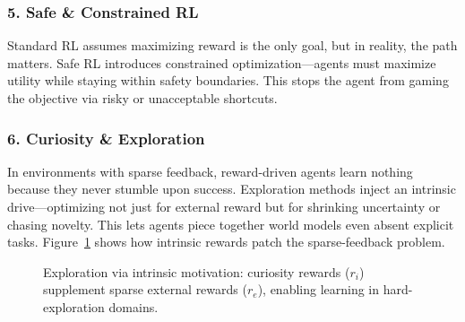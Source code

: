 \documentclass[12pt,a4paper]{report}
\theoremstyle{definition}
\begin{document}
\subsubsection*{5. Safe \& Constrained RL}
Standard RL assumes maximizing reward is the only goal, but in reality, the path matters. Safe RL introduces constrained optimization---agents must maximize utility while staying within safety boundaries. This stops the agent from gaming the objective via risky or unacceptable shortcuts.

\subsubsection*{6. Curiosity \& Exploration}
In environments with sparse feedback, reward-driven agents learn nothing because they never stumble upon success. Exploration methods inject an intrinsic drive---optimizing not just for external reward but for shrinking uncertainty or chasing novelty. This lets agents piece together world models even absent explicit tasks. Figure~\ref{fig:exploration} shows how intrinsic rewards patch the sparse-feedback problem.

\begin{figure}[htbp]
\centering
{}
\caption{Exploration via intrinsic motivation: curiosity rewards ($r_i$) supplement sparse external rewards ($r_e$), enabling learning in hard-exploration domains.}
\label{fig:exploration}
\end{figure}
\end{document}
